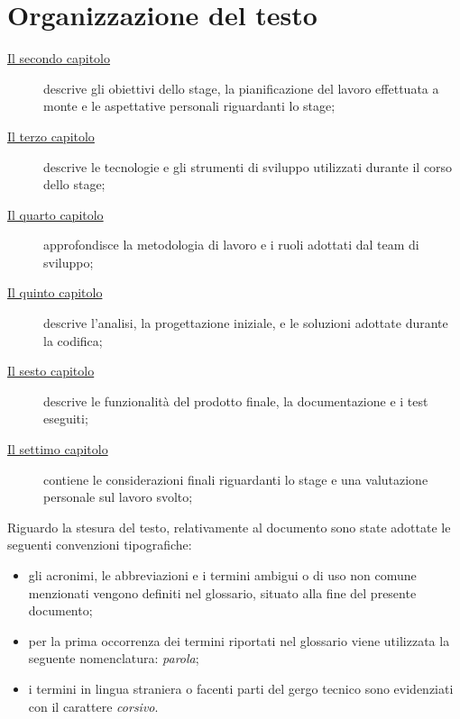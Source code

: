 \section{Organizzazione del testo}

\begin{description}
    \item[{\hyperref[cap:obiettivi-pianificazione]{Il secondo capitolo}}] descrive gli obiettivi dello stage, la pianificazione del lavoro effettuata a monte e le aspettative personali riguardanti lo stage;
    
    \item[{\hyperref[cap:tecnologie]{Il terzo capitolo}}] descrive le tecnologie e gli strumenti di sviluppo utilizzati durante il corso dello stage;
    
    \item[{\hyperref[cap:metodologia-lavoro]{Il quarto capitolo}}] approfondisce la metodologia di lavoro e i ruoli adottati dal team di sviluppo;
    
    \item[{\hyperref[cap:analisi]{Il quinto capitolo}}] descrive l'analisi, la progettazione iniziale, e le soluzioni adottate durante la codifica;
    
    \item[{\hyperref[cap:prodotto]{Il sesto capitolo}}] descrive le funzionalità del prodotto finale, la documentazione e i test eseguiti;
    
    \item[{\hyperref[cap:considerazioni]{Il settimo capitolo}}] contiene le considerazioni finali riguardanti lo stage e una valutazione personale sul lavoro svolto;

\end{description}

Riguardo la stesura del testo, relativamente al documento sono state adottate le seguenti convenzioni tipografiche:
\begin{itemize}
	\item gli acronimi, le abbreviazioni e i termini ambigui o di uso non comune menzionati vengono definiti nel glossario, situato alla fine del presente documento;
	\item per la prima occorrenza dei termini riportati nel glossario viene utilizzata la seguente nomenclatura: \emph{parola}\glsfirstoccur{};
	\item i termini in lingua straniera o facenti parti del gergo tecnico sono evidenziati con il carattere \emph{corsivo}.
\end{itemize}